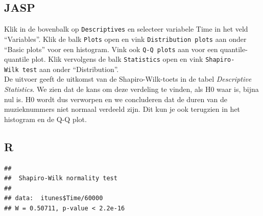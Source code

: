 \documentclass[
]{book}
\newenvironment{Shaded}{\begin{snugshade}}{\end{snugshade}}
\newcommand{\AttributeTok}[1]{\textcolor[rgb]{0.13,0.29,0.53}{#1}}
\newcommand{\CommentTok}[1]{\textcolor[rgb]{0.56,0.35,0.01}{\textit{#1}}}
\newcommand{\ConstantTok}[1]{\textcolor[rgb]{0.56,0.35,0.01}{#1}}
\newcommand{\DecValTok}[1]{\textcolor[rgb]{0.00,0.00,0.81}{#1}}
\newcommand{\FunctionTok}[1]{\textcolor[rgb]{0.13,0.29,0.53}{\textbf{#1}}}
\newcommand{\NormalTok}[1]{#1}
\newcommand{\OtherTok}[1]{\textcolor[rgb]{0.56,0.35,0.01}{#1}}
\newcommand{\SpecialCharTok}[1]{\textcolor[rgb]{0.81,0.36,0.00}{\textbf{#1}}}
\newcommand{\StringTok}[1]{\textcolor[rgb]{0.31,0.60,0.02}{#1}}
\begin{document}
\subsection{JASP}\label{jasp-6}

Klik in de bovenbalk op \texttt{Descriptives} en selecteer variabele Time in het veld ``Variables''. Klik de balk \texttt{Plots} open en vink \texttt{Distribution\ plots} aan onder ``Basic plots'' voor een histogram. Vink ook \texttt{Q-Q\ plots} aan voor een quantile-quantile plot. Klik vervolgens de balk \texttt{Statistics} open en vink \texttt{Shapiro-Wilk\ test} aan onder ``Distribution''.\\
De uitvoer geeft de uitkomst van de Shapiro-Wilk-toets in de tabel \emph{Descriptive Statistics}. We zien dat de kans om deze verdeling te vinden, als H0 waar is, bijna nul is. H0 wordt dus verworpen en we concluderen dat de duren van de muzieknummers niet normaal verdeeld zijn. Dit kun je ook terugzien in het histogram en de Q-Q plot.

\subsection{R}\label{r-6}

\begin{Shaded}
\end{Shaded}

\begin{Shaded}
\end{Shaded}

\begin{verbatim}
## 
##  Shapiro-Wilk normality test
## 
## data:  itunes$Time/60000
## W = 0.50711, p-value < 2.2e-16
\end{verbatim}
\end{document}
